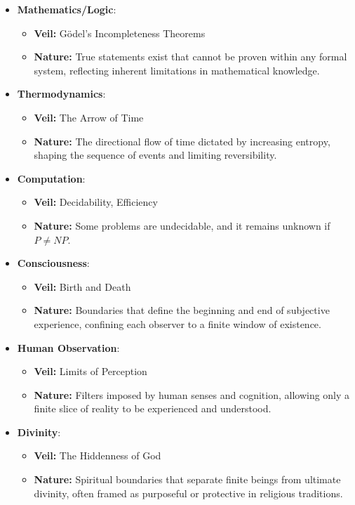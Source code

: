 \documentclass[12pt]{article}
\begin{document}
\begin{itemize}
    \item \textbf{Mathematics/Logic}:
    \begin{itemize}
        \item \textbf{Veil:} Gödel’s Incompleteness Theorems
        \item \textbf{Nature:} True statements exist that cannot be proven within any formal system, reflecting inherent limitations in mathematical knowledge.
    \end{itemize}

    \item \textbf{Thermodynamics}:
    \begin{itemize}
        \item \textbf{Veil:} The Arrow of Time
        \item \textbf{Nature:} The directional flow of time dictated by increasing entropy, shaping the sequence of events and limiting reversibility.
    \end{itemize}

    \item \textbf{Computation}:
    \begin{itemize}
        \item \textbf{Veil:} Decidability, Efficiency
        \item \textbf{Nature:} Some problems are undecidable, and it remains unknown if $P \neq NP$.
    \end{itemize}

    \item \textbf{Consciousness}:
    \begin{itemize}
        \item \textbf{Veil:} Birth and Death
        \item \textbf{Nature:} Boundaries that define the beginning and end of subjective experience, confining each observer to a finite window of existence.
    \end{itemize}

    \item \textbf{Human Observation}:
    \begin{itemize}
        \item \textbf{Veil:} Limits of Perception
        \item \textbf{Nature:} Filters imposed by human senses and cognition, allowing only a finite slice of reality to be experienced and understood.
    \end{itemize}

    \item \textbf{Divinity}:
    \begin{itemize}
        \item \textbf{Veil:} The Hiddenness of God
        \item \textbf{Nature:} Spiritual boundaries that separate finite beings from ultimate divinity, often framed as purposeful or protective in religious traditions.
    \end{itemize}
\end{itemize}
\end{document}
